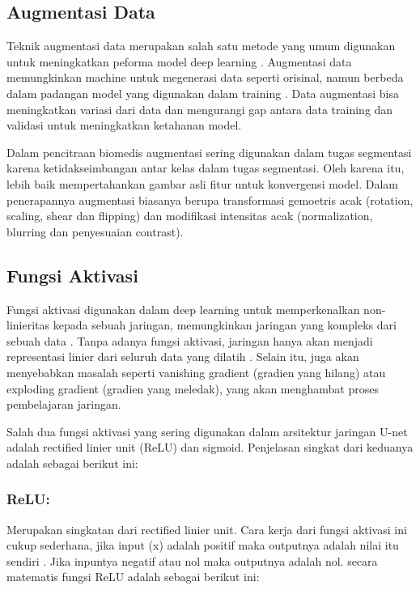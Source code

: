 \subsection{Augmentasi Data}

\noindent Teknik augmentasi data merupakan salah satu metode yang umum digunakan untuk meningkatkan peforma model deep learning \cite{minaee_image_2020}. Augmentasi data memungkinkan machine untuk megenerasi data seperti orisinal, namun berbeda dalam padangan model yang digunakan dalam training \cite{huang_fully_2020}. Data augmentasi bisa meningkatkan variasi dari data dan mengurangi gap antara data training dan validasi  untuk meningkatkan ketahanan model.

\noindent Dalam pencitraan biomedis augmentasi sering digunakan dalam tugas segmentasi karena ketidakseimbangan antar kelas dalam tugas segmentasi. Oleh karena itu, lebih baik mempertahankan gambar asli fitur untuk konvergensi model. Dalam penerapannya augmentasi biasanya berupa transformasi gemoetris acak (rotation, scaling, shear dan flipping) dan modifikasi intensitas acak (normalization, blurring dan penyesuaian contrast)\cite{minaee_image_2020}.


\subsection{Fungsi Aktivasi}

\noindent Fungsi aktivasi digunakan dalam deep learning untuk memperkenalkan non-linieritas kepada sebuah jaringan, memungkinkan jaringan yang kompleks dari sebuah data \cite{younisse_fine-tuning_2023}. Tanpa adanya fungsi aktivasi, jaringan hanya akan menjadi representasi linier dari seluruh data yang dilatih \cite{chiang_activation_2023}. Selain itu, juga akan menyebabkan masalah seperti vanishing gradient (gradien yang hilang) atau exploding gradient (gradien yang meledak), yang akan menghambat proses pembelajaran jaringan. 

\noindent Salah dua fungsi aktivasi yang sering digunakan dalam arsitektur jaringan U-net adalah rectified linier unit (ReLU) dan sigmoid. Penjelasan singkat dari keduanya adalah sebagai berikut ini:

\subsubsection{ReLU:}
Merupakan singkatan dari rectified linier unit. Cara kerja dari fungsi aktivasi ini cukup sederhana, jika input (x) adalah positif maka outputnya adalah nilai itu sendiri \cite{younisse_fine-tuning_2023}. Jika inpuntya negatif atau nol maka outputnya adalah nol. secara matematis fungsi ReLU adalah sebagai berikut ini: 

